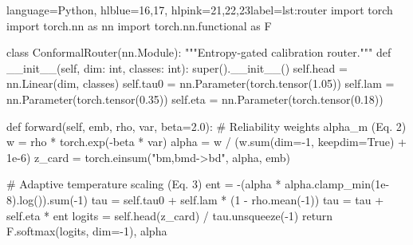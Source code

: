 \begin{hccode}{language=Python, hlblue={16,17}, hlpink={21,22,23}}{label=lst:router}
import torch
import torch.nn as nn
import torch.nn.functional as F

class ConformalRouter(nn.Module):
    """Entropy-gated calibration router."""
    def __init__(self, dim: int, classes: int):
        super().__init__()
        self.head = nn.Linear(dim, classes)
        self.tau0 = nn.Parameter(torch.tensor(1.05))
        self.lam = nn.Parameter(torch.tensor(0.35))
        self.eta = nn.Parameter(torch.tensor(0.18))

    def forward(self, emb, rho, var, beta=2.0):
        # Reliability weights alpha_m (Eq. 2)
        w = rho * torch.exp(-beta * var)
        alpha = w / (w.sum(dim=-1, keepdim=True) + 1e-6)
        z_card = torch.einsum("bm,bmd->bd", alpha, emb)

        # Adaptive temperature scaling (Eq. 3)
        ent = -(alpha * alpha.clamp_min(1e-8).log()).sum(-1)
        tau = self.tau0 + self.lam * (1 - rho.mean(-1))
        tau = tau + self.eta * ent
        logits = self.head(z_card) / tau.unsqueeze(-1)
        return F.softmax(logits, dim=-1), alpha
\end{hccode}

